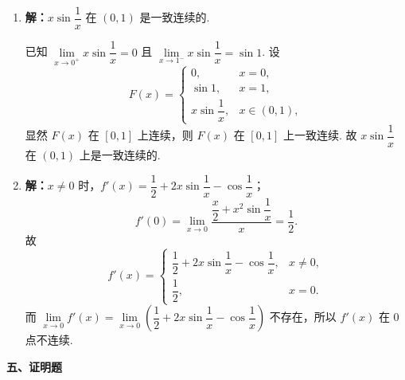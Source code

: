 \documentclass[a4paper,11pt]{ctexart}
\begin{document}
\begin{enumerate}[label=\arabic*., leftmargin=2em, itemsep=0.9em, topsep=0.4em]
  \item \textbf{解：}$x\sin\dfrac{1}{x}$ 在 $(0,1)$ 是一致连续的.

  已知 $\lim\limits_{x\to 0^+}x\sin\dfrac{1}{x}=0$ 且 $\lim\limits_{x\to 1^-}x\sin\dfrac{1}{x}=\sin 1$. 设
  \[
    F(x)=\begin{cases}
      0, & x=0, \\
      \sin 1, & x=1, \\
      x\sin\dfrac{1}{x}, & x\in(0,1),
    \end{cases}
  \]
  显然 $F(x)$ 在 $[0,1]$ 上连续，则 $F(x)$ 在 $[0,1]$ 上一致连续. 故 $x\sin\dfrac{1}{x}$ 在 $(0,1)$ 上是一致连续的.

  \item \textbf{解：}$x\neq 0$ 时，$f'(x)=\dfrac{1}{2}+2x\sin\dfrac{1}{x}-\cos\dfrac{1}{x}$；
  \[
    f'(0)=\lim_{x\to 0}\frac{\dfrac{x}{2}+x^2\sin\dfrac{1}{x}}{x}=\frac{1}{2}.
  \]
  故
  \[
    f'(x)=\begin{cases}
      \dfrac{1}{2}+2x\sin\dfrac{1}{x}-\cos\dfrac{1}{x}, & x\neq 0, \\[0.4em]
      \dfrac{1}{2}, & x=0.
    \end{cases}
  \]
  而 $\lim\limits_{x\to 0}f'(x)=\lim\limits_{x\to 0}\left(\dfrac{1}{2}+2x\sin\dfrac{1}{x}-\cos\dfrac{1}{x}\right)$ 不存在，所以 $f'(x)$ 在 $0$ 点不连续.
\end{enumerate}

\vspace{0.6em}
\textbf{五、证明题}
\end{document}
